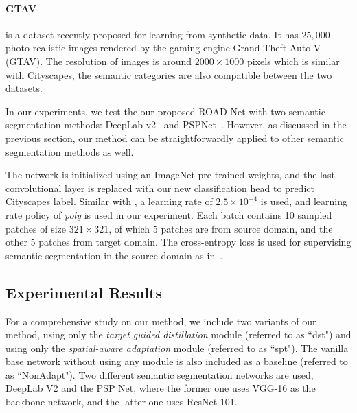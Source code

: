 \documentclass[10pt,twocolumn,letterpaper]{article}
\begin{document}
\vspace{-4mm}

\paragraph{GTAV} is a dataset recently proposed for learning from synthetic data. It has $25,000$ photo-realistic images rendered by the gaming engine Grand Theft Auto V (GTAV). The resolution of images is around $2000\times 1000$ pixels which is similar with Cityscapes, the semantic categories are also compatible between the two datasets.

In our experiments, we test the our proposed ROAD-Net with two semantic segmentation methods: DeepLab v2~\cite{chen2016deeplab} and PSPNet~\cite{zhao2016pyramid}. However, as discussed in the previous section, our method can be straightforwardly applied to other semantic segmentation methods as well. 

The network is initialized using an ImageNet pre-trained weights, and the last convolutional layer is replaced with our new classification head to predict Cityscapes label. Similar with \cite{chen2016deeplab}, a learning rate of $2.5\times 10^{-4}$ is used, and learning rate policy of \textit{poly} is used in our experiment. Each batch contains 10 sampled patches of size $321\times 321$, of which $5$ patches are from source domain, and the other $5$ patches from target domain. The cross-entropy loss is used for supervising semantic segmentation in the source domain as in~\cite{long2015fully,chen2016deeplab}. 


\subsection{Experimental Results}
\label{sec:exp_results}
For a comprehensive study on our method, we include two variants of our method, using only the \textit{target guided distillation} module (referred to as ``dst") and using  only the \textit{spatial-aware adaptation} module (referred to as ``spt"). The vanilla base network without using any module is also included as a baseline (referred to as ``NonAdapt"). Two different semantic segmentation networks are used, DeepLab V2 and the PSP Net, where the former one uses VGG-16 as the backbone network, and the latter one uses ResNet-101. 
\end{document}

